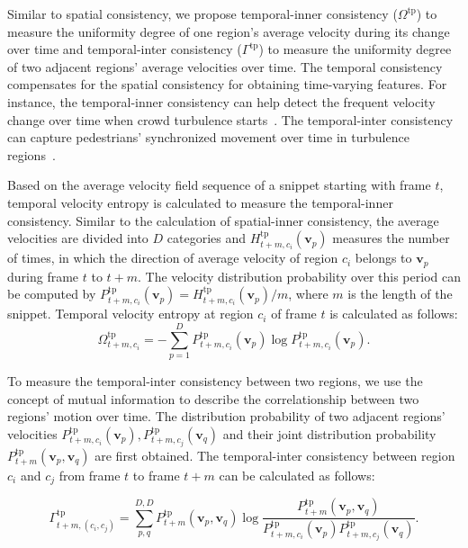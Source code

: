 \documentclass[journal]{IEEEtran}
\begin{document}
Similar to spatial consistency, we propose temporal-inner consistency ($ \Omega^{\mathrm{tp}} $) to measure the uniformity degree of one region's average velocity during its change over time and temporal-inter consistency ($ \Gamma^{\mathrm{tp}} $) to measure the uniformity degree of two adjacent regions' average velocities over time.
The temporal consistency compensates for the spatial consistency for obtaining time-varying features. For instance, the temporal-inner consistency can help detect the frequent velocity change over time when crowd turbulence starts~\cite{helbing2007dynamics,ma2013new}. The temporal-inter consistency can capture pedestrians' synchronized movement over time in turbulence regions~\cite{lian2016correlation}.

Based on the average velocity field sequence of a snippet starting with frame $t$, temporal velocity entropy is calculated to measure the temporal-inner consistency. Similar to the calculation of spatial-inner consistency, the average velocities are divided into $ D $ categories and $ H^{\mathrm{tp}}_{t+m,c_i}(\mathbf{v}_p)$ measures the number of times, in which the direction of average velocity of region $c_i$ belongs to $\mathbf{v}_p$ during frame $t$ to $t+m$. The velocity distribution probability over this period can be computed by $P^{\mathrm{tp}}_{t+m,c_i}(\mathbf{v}_p) = H^{\mathrm{tp}}_{t+m,c_i}(\mathbf{v}_p) / m$, where $m$ is the length of the snippet. Temporal velocity entropy at region $ c_i $ of frame $ t $ is calculated as follows:
\begin{equation}
\Omega^{\mathrm{tp}}_{t+m,c_i}=-\sum_{p=1}^{D} P^{\mathrm{tp}}_{t+m,c_i}(\mathbf{v}_p) \log P^{\mathrm{tp}}_{t+m,c_i}(\mathbf{v}_p).
\end{equation}

To measure the temporal-inter consistency between two regions, we use the concept of mutual information to describe the correlationship between two regions' motion over time. The distribution probability of two adjacent regions' velocities $  {P}^{\mathrm{tp}}_{t+m,c_i}(\mathbf{v}_p), {P}^{\mathrm{tp}}_{t+m,c_j}(\mathbf{v}_q) $ and
their joint distribution probability $ {P}^{\mathrm{tp}}_{t+m}(\mathbf{v}_p,\mathbf{v}_q) $ are first obtained. The temporal-inter consistency between region $c_i$ and $c_j$ from frame $t$ to frame $t+m$ can be calculated as follows:
\begin{small}
\begin{equation}
\Gamma^{\mathrm{tp}}_{t+m,(\!c_i,c_j\!)}\!=\!
\sum_{p,q}^{D\!,D}\!
 {P}^{\mathrm{tp}}_{t+m}(\!\mathbf{v}_p,\!\mathbf{v}_q\!) \!\log \!
\frac{{P}^{\mathrm{tp}}_{t+m}(\mathbf{v}_p,\!\mathbf{v}_q)}
{{P}^{\mathrm{tp}}_{t+m,c_i}\!(\!\mathbf{v}_p\!) {P}^{\mathrm{tp}}_{t+m,c_j}\!(\!\mathbf{v}_q\!)}\!.
\end{equation}
\end{small}
\end{document}
